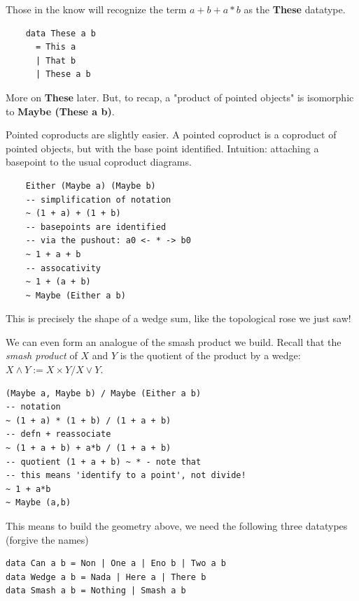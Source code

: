 \documentclass[tikz]{beamer}
\theoremstyle{definition}
\begin{document}
\frame
{
	Those in the know will recognize the term $a + b + a*b$ as the \textbf{These} datatype.
}

\begin{frame}[fragile]
\begin{center}
	\begin{verbatim}
	data These a b 
	  = This a
	  | That b
	  | These a b
	\end{verbatim}
\end{center}
\end{frame}

\frame
{
	More on \textbf{These} later. But, to recap, a "product of pointed objects" is isomorphic to \textbf{Maybe (These a b)}.
}

\frame
{
	Pointed coproducts are slightly easier. A pointed coproduct is a coproduct of pointed objects, but with the base point identified. Intuition: attaching a basepoint to the usual coproduct diagrams.
}

\begin{frame}[fragile]
\begin{center}
	\begin{verbatim}
	Either (Maybe a) (Maybe b)
	-- simplification of notation
	~ (1 + a) + (1 + b)
	-- basepoints are identified 
	-- via the pushout: a0 <- * -> b0
	~ 1 + a + b
	-- assocativity
	~ 1 + (a + b)
	~ Maybe (Either a b)
	\end{verbatim}
\end{center}
\end{frame}

\frame
{
	This is precisely the shape of a wedge sum, like the topological rose we just saw!
}

\frame
{
	We can even form an analogue of the smash product we build. Recall that the \textit{smash product} of $X$ and $Y$ is the quotient of the product by a wedge: $X \wedge Y := X \times Y / X \vee Y$.
}

\begin{frame}[fragile]
\begin{verbatim}
(Maybe a, Maybe b) / Maybe (Either a b)
-- notation
~ (1 + a) * (1 + b) / (1 + a + b)
-- defn + reassociate
~ (1 + a + b) + a*b / (1 + a + b)
-- quotient (1 + a + b) ~ * - note that
-- this means 'identify to a point', not divide!
~ 1 + a*b
~ Maybe (a,b)
\end{verbatim}
\end{frame}

\frame
{
	This means to build the geometry above, we need the following three datatypes (forgive the names)
}
\begin{frame}[fragile]
\begin{verbatim}
data Can a b = Non | One a | Eno b | Two a b
data Wedge a b = Nada | Here a | There b
data Smash a b = Nothing | Smash a b
\end{verbatim}
\end{frame}
\end{document}
